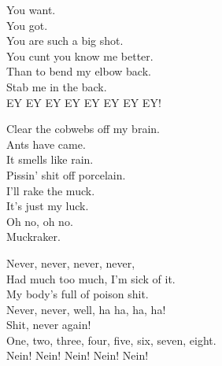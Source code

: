 




You want. \\
You got. \\
You are such a big shot. \\
You cunt you know me better. \\
Than to bend my elbow back. \\
Stab me in the back. \\

EY EY EY EY EY EY EY EY! \\




Clear the cobwebs off my brain. \\
Ants have came. \\
It smells like rain. \\

Pissin' shit off porcelain. \\
I'll rake the muck. \\
It's just my luck. \\

Oh no, oh no. \\
Muckraker. \\




Never, never, never, never, \\
Had much too much, I'm sick of it. \\
My body's full of poison shit. \\
Never, never, well, ha ha, ha, ha! \\

Shit, never again! \\

One, two, three, four, five, six, seven, eight. \\
Nein! Nein! Nein! Nein! Nein! \\

